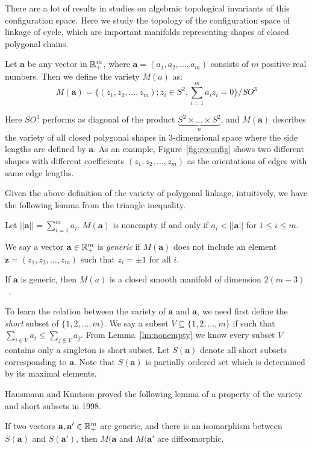 There are a lot of results in studies on algebraic topological invariants of this configuration space.
Here we study the topology of the configuration space of linkage of cycle, which are important manifolds representing shapes of closed polygonal chains.

Let \(\mathbf{a}\) be any vector in \(\mathbb{R}^m_{+}\), where \(\mathbf{a}=(a_1,a_2,\dots,a_m)\) consists of \(m\) positive real numbers. Then we define the variety \(M(a)\) as:
\[M(\mathbf{a})=\{(z_1,z_2,\dots,z_m);z_i\in S^2, \sum^m_{i=1}a_iz_i=0\}/SO^3\]

Here \(SO^3\) performs as diagonal of the product \(\underbrace{S^2\times \dots \times S^2}_{n}\), and \(M(\mathbf{a})\) describes the variety of all closed polygonal shapes in \(3\)-dimensional space where the side lengths are defined by \(\mathbf{a}\). As an example, Figure~\ref{fig:reconfig} shows two different shapes with different coefficients \((z_1,z_2,\dots,z_m)\) as the orientations of edges with same edge lengths.

Given the above definition of the variety of polygonal linkage, intuitively, we have the following lemma from the triangle inequality.
\begin{lemma}\label{lm:nonempty}
  Let \(||\mathbf{a}||=\sum^m_{i=1}a_i\). \(M(\mathbf{a})\) is nonempty if and only if \(a_i<||\mathbf{a}||\) for \(1\le i\le m\).
\end{lemma}

We say a vector \(\mathbf{a}\in \mathbb{R}^m_+\) is \textit{generic} if \(M(\mathbf{a})\) does not include an element \(\mathbf{z}=(z_1,z_2,\dots,z_m)\) such that \(z_i=\pm{1}\) for all \(i\).

\begin{lemma}
If \(\mathbf{a}\) is generic, then \(M(a)\) is a closed smooth manifold of dimension \(2(m-3)\)~\cite{DBLP:journals/dcg/Farber03}.
\end{lemma}

To learn the relation between the variety of \(\mathbf{a}\) and \(\mathbf{a}\), we need first define the \textit{short} subset of \(\{1,2,\dots,m\}\).
We say a subset \(V\subseteq \{1,2,\dots,m\}\) if such that \(\sum_{i\in V}a_i\le \sum_{j\notin V}a_j\).
From Lemma~\ref{lm:nonempty} we know every subset \(V\) contains only a singleton is short subset.
Let \(S(\mathbf{a})\) denote all short subsets corresponding to \(\mathbf{a}\). Note that \(S(\mathbf{a})\) is partially ordered set which is determined by its maximal elements.

Hausmann and Knutson proved the following lemma of a property of the variety and short subsets in 1998.
\begin{lemma}
If two vectors \(\mathbf{a}, \mathbf{a}'\in \mathbb{R}^m_+\) are generic, and there is an isomorphism between \(S(\mathbf{a})\) and \(S(\mathbf{a}')\), then \(M(\mathbf{a}\) and \(M(\mathbf{a}'\) are diffeomorphic.
\end{lemma}

